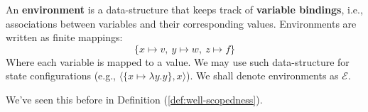 \begin{Def}[Environment]

    \label{def:environment}

    \noindent
    An \textbf{environment} is a data-structure that keeps track of \textbf{variable bindings}, i.e., associations between variables and their corresponding values. Environments are written as finite mappings:
    \LARGE
    \[
        \{ x \mapsto v,\ y \mapsto w,\ z \mapsto f \}
    \]
    \normalsize
    Where each variable is mapped to a value. We may use such data-structure for state configurations (e.g., $\langle\{x\mapsto \lambda y.y\}, x  \rangle$). We shall denote environments as $\mathcal{E}$.
\end{Def}
\noindent
We've seen this before in Definition (\ref{def:well-scopedness}).
